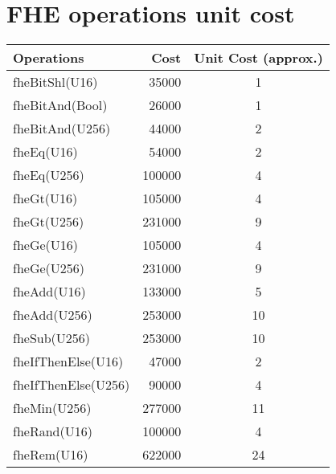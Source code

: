 \section{FHE operations unit cost}

\renewcommand{\arraystretch}{1.5}
\begin{tabular}{ |l|r|c| }
    \hline    
    Operations & Cost & Unit Cost (approx.) \\ 
    \hline
    fheBitShl(U16)      &  35000     & 1  \\
    fheBitAnd(Bool)     &  26000     & 1  \\
    fheBitAnd(U256)     &  44000     & 2  \\
    fheEq(U16)          &  54000     & 2  \\
    fheEq(U256)         & 100000     & 4  \\
    fheGt(U16)          & 105000     & 4  \\
    fheGt(U256)         & 231000     & 9  \\
    fheGe(U16)          & 105000     & 4  \\
    fheGe(U256)         & 231000     & 9  \\
    fheAdd(U16)         & 133000     & 5   \\
    fheAdd(U256)        & 253000     & 10  \\
    fheSub(U256)        & 253000     & 10  \\
    fheIfThenElse(U16)  &  47000     & 2   \\
    fheIfThenElse(U256) &  90000     & 4   \\
    fheMin(U256)        & 277000     & 11  \\
    fheRand(U16)        & 100000     & 4   \\
    fheRem(U16)         & 622000     & 24  \\
    \hline
\end{tabular}
